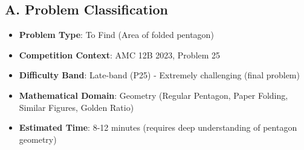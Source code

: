 \documentclass[12pt]{article}
\begin{document}
\begin{problemconfigbox}
\subsection*{A. Problem Classification}
\begin{itemize}[leftmargin=*]
    \item \textbf{Problem Type}: To Find (Area of folded pentagon)
    \item \textbf{Competition Context}: AMC 12B 2023, Problem 25
    \item \textbf{Difficulty Band}: Late-band (P25) - Extremely challenging (final problem)
    \item \textbf{Mathematical Domain}: Geometry (Regular Pentagon, Paper Folding, Similar Figures, Golden Ratio)
    \item \textbf{Estimated Time}: 8-12 minutes (requires deep understanding of pentagon geometry)
\end{itemize}


\end{problemconfigbox}
\end{document}
